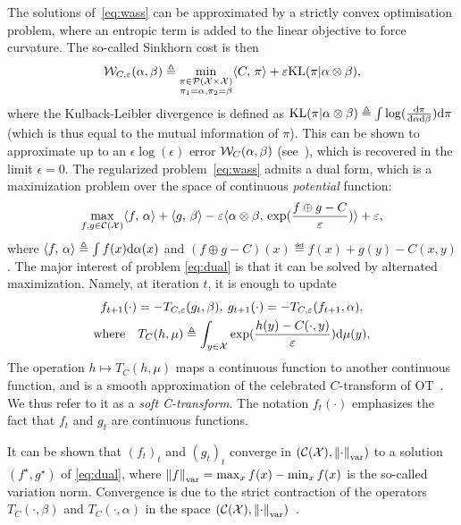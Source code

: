 The solutions of~\eqref{eq:wass} can be approximated by a strictly convex optimisation problem, where an entropic term is added to the linear objective to force curvature. The so-called Sinkhorn cost is then
\begin{equation}\label{eq:wass}
    \mathcal{W}_{C,\varepsilon}(\alpha, \beta) \triangleq 
    \min_{
    \substack{
        \pi \in \mathcal{P}(\mathcal{X} \times \mathcal{X})
        \\\pi_1 = \alpha, \pi_2 = \beta
    }    
    } \langle C,\,\pi\rangle + \varepsilon \textrm{KL}(\pi | \alpha \otimes \beta),
\end{equation}
where the Kulback-Leibler divergence is defined as $\textrm{KL}(\pi | \alpha \otimes \beta) \triangleq \int \log(\frac{\textrm{d}\pi}{\textrm{d}\alpha\textrm{d}\beta}) \textrm{d}\pi$ (which is thus equal to the mutual information of $\pi$).
%
This can be shown to approximate up to an $\epsilon \log(\epsilon)$ error $\mathcal{W}_C(\alpha,\beta)$ (see~\cite{2019-Genevay-aistats}), which is recovered in the limit $\epsilon=0$. 
%
The regularized problem~\eqref{eq:wass} admits a dual form, which is a maximization problem over the space of continuous \textit{potential} function:
\begin{equation}\label{eq:dual}
    \max_{f, g \in \mathcal{C}(\mathcal{X})} \langle f,\,\alpha\rangle + \langle g,\,\beta\rangle
    - \varepsilon \langle \alpha \otimes \beta,\,\exp(\frac{f \oplus g - C}{\varepsilon})\rangle + \varepsilon, 
\end{equation}
where $\langle f,\,\alpha\rangle \triangleq \int f(x) \textrm{d}\alpha(x)$ and $(f \oplus g - C)(x) \eqdef f(x)+g(y)-C(x,y)$.
%
The major interest of problem \eqref{eq:dual} is that it can be solved by alternated maximization. Namely, at iteration $t$, it is enough to update
\begin{gather}\label{eq:sinkhorn}
    f_{t+1}(\cdot) = - T_{C,\varepsilon}(g_t, \beta), \:
    g_{t+1}(\cdot) = - T_{C,\varepsilon}(f_{t+1}, \alpha), \\
    \text{where} \quad 
    T_C(h, \mu) \triangleq \int_{y \in \mathcal{X}} \exp(\frac{h(y) - C(\cdot, y)}{\varepsilon})\textrm{d} \mu(y),
\end{gather}
The operation $h \mapsto T_C(h, \mu)$  maps a continuous function to another continuous function, and is a smooth approximation of the celebrated $C$-transform of OT~\cite{santambrogio2015optimal}. We thus refer to it as a \textit{soft C-transform}. 
%
The notation $f_t(\cdot)$ emphasizes the fact that $f_t$ and $g_t$ are continuous functions. 
%

It can be shown that ${(f_t)}_t$ and ${(g_t)}_t$ converge in $(\mathcal{C}(\mathcal{X}), \left\| \cdot \right\|_{\text{var}})$ to a
solution $(f^\star, g^\star)$ of \eqref{eq:dual}, where $\left\| f
 \right\|_{\text{var}} = \max_x f(x) - \min_x f(x)$ is the so-called variation norm.
% 
Convergence is due to the strict contraction of the operators $T_C(\cdot, \beta)$ and
$T_{C}(\cdot, \alpha)$ in the space $(\mathcal{C}(\mathcal{X}), \left\| \cdot \right\|_{\text{var}})$~\cite{peyre2019computational}.

